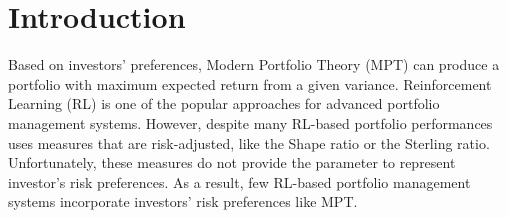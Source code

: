 \chapter{Introduction}

Based on investors' preferences, Modern Portfolio Theory (MPT) can produce a portfolio with maximum expected return from a given variance\cite{10.2307/2975974}. Reinforcement Learning (RL) is one of the popular approaches for advanced portfolio management systems.  However, despite many RL-based portfolio performances uses measures that are risk-adjusted\cite{cogneau2009101}, like the Shape ratio\cite{Sharpe49} or the Sterling ratio\cite{magdon2004maximum}. Unfortunately, these measures do not provide the parameter to represent investor's risk preferences. As a result,  few RL-based portfolio management systems incorporate investors' risk preferences like MPT. 







\label{c:intro}

